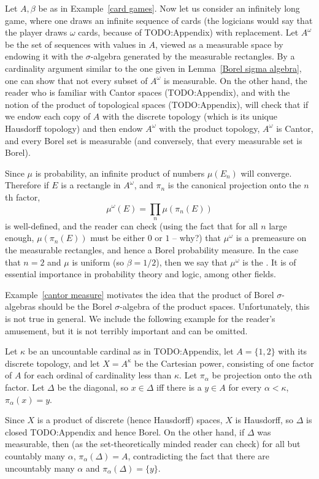 \begin{example}
\label{cantor measure}
Let $A, \beta$ be as in Example~\ref{card games}.
Now let us consider an infinitely long game, where one draws an infinite sequence of cards (the logicians would say that the player draws $\omega$ cards, because of TODO:Appendix) with replacement.
Let $A^\omega$ be the set of sequences with values in $A$, viewed as a measurable space by endowing it with the $\sigma$-algebra generated by the measurable rectangles.
By a cardinality argument similar to the one given in Lemma~\ref{Borel sigma algebra}, one can show that not every subset of $A^\omega$ is measurable.
On the other hand, the reader who is familiar with Cantor spaces (TODO:Appendix), and with the notion of the product of topological spaces (TODO:Appendix), will check that if we endow each copy of $A$ with the discrete topology (which is its unique Hausdorff topology) and then endow $A^\omega$ with the product topology, $A^\omega$ is Cantor, and every Borel set is measurable (and conversely, that every measurable set is Borel).

Since $\mu$ is probability, an infinite product of numbers $\mu(E_{n})$ will converge. Therefore if $E$ is a rectangle in $A^\omega$, and $\pi_{n}$ is the canonical projection onto the $n$th factor,
\[\mu^\omega(E) = \prod_{n} \mu(\pi_{n}(E))\]
is well-defined, and the reader can check (using the fact that for all $n$ large enough, $\mu(\pi_{n}(E))$ must be either $0$ or $1$ -- why?) that $\mu^\omega$ is a premeasure on the measurable rectangles, and hence a Borel probability measure.
In the case that $n = 2$ and $\mu$ is uniform (so $\beta = 1/2$), then we say that $\mu^\omega$ is the .
It is of essential importance in probability theory and logic, among other fields.
\end{example}

Example~\ref{cantor measure} motivates the idea that the product of Borel $\sigma$-algebras should be the Borel $\sigma$-algebra of the product spaces.
Unfortunately, this is not true in general.
We include the following example for the reader's amusement, but it is not terribly important and can be omitted.

\begin{example}
Let $\kappa$ be an uncountable cardinal as in TODO:Appendix, let $A = \{1, 2\}$ with its discrete topology, and let $X = A^\kappa$ be the Cartesian power, consisting of one factor of $A$ for each ordinal of cardinality less than $\kappa$. Let $\pi_\alpha$ be projection onto the $\alpha$th factor.
Let $\Delta$ be the diagonal, so $x \in \Delta$ iff there is a $y \in A$ for every $\alpha < \kappa$, $\pi_\alpha(x) = y$.

Since $X$ is a product of discrete (hence Hausdorff) spaces, $X$ is Hausdorff, so $\Delta$ is closed TODO:Appendix and hence Borel.
On the other hand, if $\Delta$ was measurable, then (as the set-theoretically minded reader can check) for all but countably many $\alpha$, $\pi_\alpha(\Delta) = A$, contradicting the fact that there are uncountably many $\alpha$ and $\pi_\alpha(\Delta) = \{y\}$.
\end{example}

